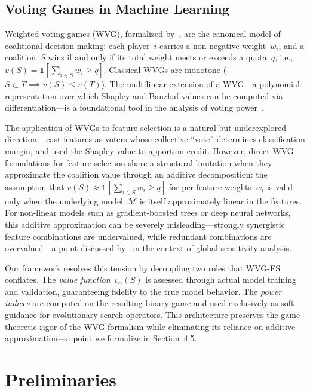 \documentclass{article} %
\begin{document}
\subsection{Voting Games in Machine Learning}

Weighted voting games (WVG), formalized by~\citet{owen1972multilinear}, are the canonical model of coalitional decision-making: each player~$i$ carries a non-negative weight~$w_i$, and a coalition~$S$ wins if and only if its total weight meets or exceeds a quota~$q$, i.e., $v(S) = \mathbb{1}[\sum_{i \in S} w_i \geq q]$. Classical WVGs are monotone ($S \subset T \implies v(S) \leq v(T)$). The multilinear extension of a WVG---a polynomial representation over which Shapley and Banzhaf values can be computed via differentiation---is a foundational tool in the analysis of voting power~\citep{owen1972multilinear,straffin1977shapley}.

The application of WVGs to feature selection is a natural but underexplored direction.~\citet{cohen2007feature} cast features as voters whose collective ``vote'' determines classification margin, and used the Shapley value to apportion credit. However, direct WVG formulations for feature selection share a structural limitation when they approximate the coalition value through an additive decomposition: the assumption that $v(S) \approx \mathbb{1}[\sum_{i \in S} w_i \geq q]$ for per-feature weights~$w_i$ is valid only when the underlying model~$\mathcal{M}$ is itself approximately linear in the features. For non-linear models such as gradient-boosted trees or deep neural networks, this additive approximation can be severely misleading---strongly synergistic feature combinations are undervalued, while redundant combinations are overvalued---a point discussed by~\citet{song2016shapley} in the context of global sensitivity analysis.

Our framework resolves this tension by decoupling two roles that WVG-FS conflates. The {\em value function}~$v_\alpha(S)$ is assessed through actual model training and validation, guaranteeing fidelity to the true model behavior. The {\em power indices} are computed on the resulting binary game and used exclusively as soft guidance for evolutionary search operators. This architecture preserves the game-theoretic rigor of the WVG formalism while eliminating its reliance on additive approximation---a point we formalize in Section~4.5.

\section{Preliminaries}
\label{sec:prelim}
\end{document}
